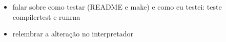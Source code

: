 
\begin{itemize}
	\item falar sobre como testar (README e make) e como eu testei: teste compilertest e runrna
	\item relembrar a alteração no interpretador
\end{itemize}
